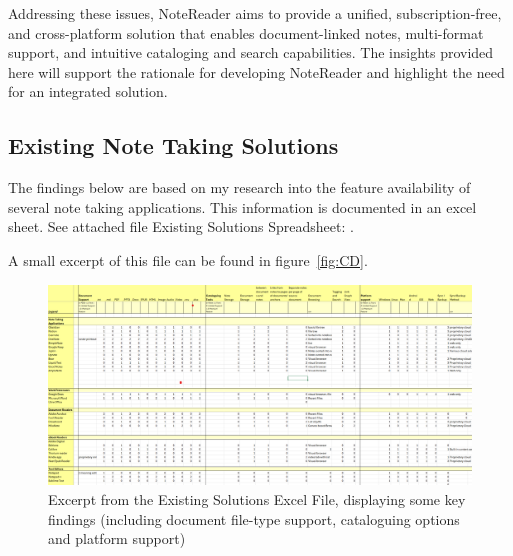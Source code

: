 Addressing these issues, NoteReader aims to provide a unified, subscription-free, and cross-platform solution that enables document-linked notes, multi-format support, and intuitive cataloging and search capabilities. The insights provided here will support the rationale for developing NoteReader and highlight the need for an integrated solution.

\subsection{Existing Note Taking Solutions}
    The findings below are based on my research into the feature availability of several note taking applications. This information is documented in an excel sheet. See attached file Existing Solutions Spreadsheet: . 
    
    A small excerpt of this file can be found in figure~\ref{fig:CD}.

    \begin{figure}
    \centering
    \includegraphics[width=1\linewidth]{Figures/existing solutions excerpt.png}
    \caption{Excerpt from the Existing Solutions Excel File, displaying some key findings (including document file-type support, cataloguing options and platform support)}
    \label{fig:Existing}
    \end{figure}


